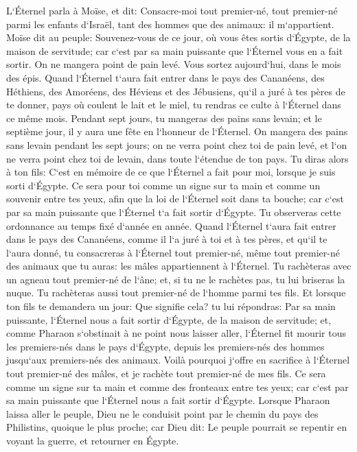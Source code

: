 \verse L`Éternel parla à Moïse, et dit: 
\verse Consacre-moi tout premier-né, tout premier-né parmi les enfants d`Israël, tant des hommes que des animaux: il m`appartient. 
\verse Moïse dit au peuple: Souvenez-vous de ce jour, où vous êtes sortis d`Égypte, de la maison de servitude; car c`est par sa main puissante que l`Éternel vous en a fait sortir. On ne mangera point de pain levé. 
\verse Vous sortez aujourd`hui, dans le mois des épis. 
\verse Quand l`Éternel t`aura fait entrer dans le pays des Cananéens, des Héthiens, des Amoréens, des Héviens et des Jébusiens, qu`il a juré à tes pères de te donner, pays où coulent le lait et le miel, tu rendras ce culte à l`Éternel dans ce même mois. 
\verse Pendant sept jours, tu mangeras des pains sans levain; et le septième jour, il y aura une fête en l`honneur de l`Éternel. 
\verse On mangera des pains sans levain pendant les sept jours; on ne verra point chez toi de pain levé, et l`on ne verra point chez toi de levain, dans toute l`étendue de ton pays. 
\verse Tu diras alors à ton fils: C`est en mémoire de ce que l`Éternel a fait pour moi, lorsque je suis sorti d`Égypte. 
\verse Ce sera pour toi comme un signe sur ta main et comme un souvenir entre tes yeux, afin que la loi de l`Éternel soit dans ta bouche; car c`est par sa main puissante que l`Éternel t`a fait sortir d`Égypte. 
\verse Tu observeras cette ordonnance au temps fixé d`année en année. 
\verse Quand l`Éternel t`aura fait entrer dans le pays des Cananéens, comme il l`a juré à toi et à tes pères, et qu`il te l`aura donné, 
\verse tu consacreras à l`Éternel tout premier-né, même tout premier-né des animaux que tu auras: les mâles appartiennent à l`Éternel. 
\verse Tu rachèteras avec un agneau tout premier-né de l`âne; et, si tu ne le rachètes pas, tu lui briseras la nuque. Tu rachèteras aussi tout premier-né de l`homme parmi tes fils. 
\verse Et lorsque ton fils te demandera un jour: Que signifie cela? tu lui répondras: Par sa main puissante, l`Éternel nous a fait sortir d`Égypte, de la maison de servitude; 
\verse et, comme Pharaon s`obstinait à ne point nous laisser aller, l`Éternel fit mourir tous les premiers-nés dans le pays d`Égypte, depuis les premiers-nés des hommes jusqu`aux premiers-nés des animaux. Voilà pourquoi j`offre en sacrifice à l`Éternel tout premier-né des mâles, et je rachète tout premier-né de mes fils. 
\verse Ce sera comme un signe sur ta main et comme des fronteaux entre tes yeux; car c`est par sa main puissante que l`Éternel nous a fait sortir d`Égypte. 
\verse Lorsque Pharaon laissa aller le peuple, Dieu ne le conduisit point par le chemin du pays des Philistins, quoique le plus proche; car Dieu dit: Le peuple pourrait se repentir en voyant la guerre, et retourner en Égypte. 
